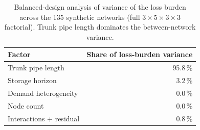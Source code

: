 \begin{table}[t]
\centering
\caption{Balanced-design analysis of variance of the loss burden across the 135 synthetic
networks (full $3\times5\times3\times3$ factorial). Trunk pipe length dominates the
between-network variance.}
\label{tab:synthanova}
\begin{tabular}{lr}
\hline
Factor & Share of loss-burden variance \\
\hline
Trunk pipe length & 95.8\,\% \\
Storage horizon & 3.2\,\% \\
Demand heterogeneity & 0.0\,\% \\
Node count & 0.0\,\% \\
Interactions + residual & 0.8\,\% \\
\hline
\end{tabular}
\end{table}
